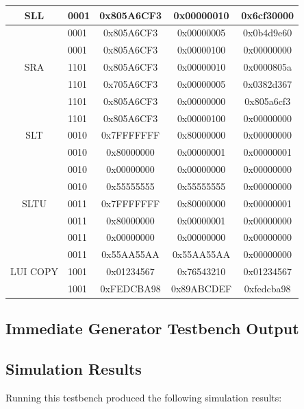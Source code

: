 \documentclass[
    a4paper, %
	12pt, %
    ]{CSSullivanBusinessReport}
\begin{document}
\begin{fullwidth}
\begin{table}[H]
\begin{tabular}{|c||l|c|c|c|}
    \hline
    SLL&0001& 0x805A6CF3& 0x00000010&0x6cf30000\\\hline
    &0001& 0x805A6CF3& 0x00000005&0x0b4d9e60\\\hline
    &0001& 0x805A6CF3& 0x00000100&0x00000000\\\hline
    \hline
    SRA&1101& 0x805A6CF3& 0x00000010&0x0000805a\\\hline
    &1101& 0x705A6CF3& 0x00000005&0x0382d367\\\hline
    &1101& 0x805A6CF3& 0x00000000&0x805a6cf3\\\hline
    &1101& 0x805A6CF3& 0x00000100&0x00000000\\\hline
    \hline
    SLT&0010& 0x7FFFFFFF& 0x80000000&0x00000000\\\hline
    &0010& 0x80000000& 0x00000001&0x00000001\\\hline
    &0010& 0x00000000& 0x00000000&0x00000000\\\hline
    &0010& 0x55555555& 0x55555555&0x00000000\\\hline
    \hline
    SLTU&0011& 0x7FFFFFFF& 0x80000000&0x00000001\\\hline
    &0011& 0x80000000& 0x00000001&0x00000000\\\hline
    &0011& 0x00000000& 0x00000000&0x00000000\\\hline
    &0011& 0x55AA55AA& 0x55AA55AA&0x00000000\\\hline
    \hline
    LUI COPY&1001& 0x01234567& 0x76543210&0x01234567\\\hline
    &1001& 0xFEDCBA98& 0x89ABCDEF&0xfedcba98\\\hline
    \end{tabular}
\end{table}

\newpage
\subsection{Immediate Generator Testbench Output} %


\newpage
\subsection{Simulation Results} %

Running this testbench produced the following simulation results:


\end{fullwidth}
\end{document}
